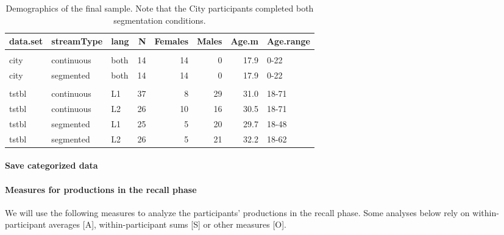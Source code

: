 \documentclass[]{article}
\let\oldparagraph\paragraph
\renewcommand{\paragraph}[1]{\oldparagraph{#1}\mbox{}}
\begin{document}
\begin{table}

\caption{\label{tab:recall-final-demographics-print}Demographics of the final sample. Note that the City participants completed both segmentation conditions.}
\centering
\begin{tabular}[t]{lllrrrrl}
\toprule
data.set & streamType & lang & N & Females & Males & Age.m & Age.range\\
\midrule
\addlinespace[0.3em]
\multicolumn{8}{l}{\textbf{city}}\\
\hspace{1em}city & continuous & both & 14 & 14 & 0 & 17.9 & 0-22\\
\hspace{1em}city & segmented & both & 14 & 14 & 0 & 17.9 & 0-22\\
\addlinespace[0.3em]
\multicolumn{8}{l}{\textbf{tstbl}}\\
\hspace{1em}tstbl & continuous & L1 & 37 & 8 & 29 & 31.0 & 18-71\\
\hspace{1em}tstbl & continuous & L2 & 26 & 10 & 16 & 30.5 & 18-71\\
\hspace{1em}tstbl & segmented & L1 & 25 & 5 & 20 & 29.7 & 18-48\\
\hspace{1em}tstbl & segmented & L2 & 26 & 5 & 21 & 32.2 & 18-62\\
\bottomrule
\end{tabular}
\end{table}

\paragraph{Save categorized data}\label{save-categorized-data}

\paragraph{Measures for productions in the recall
phase}\label{measures-for-productions-in-the-recall-phase}

We will use the following measures to analyze the participants'
productions in the recall phase. Some analyses below rely on
within-participant averages {[}A{]}, within-participant sums {[}S{]} or
other measures {[}O{]}.
\end{document}
